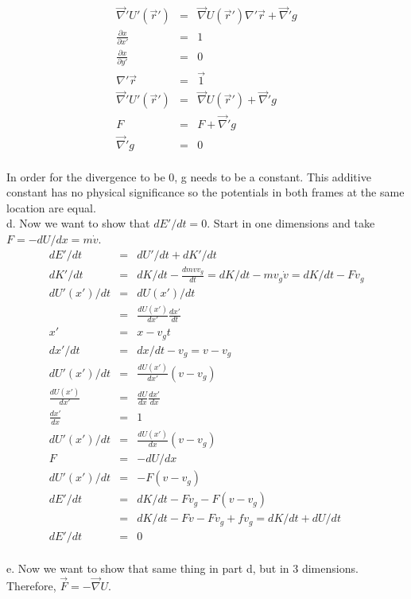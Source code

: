 \documentclass[11pt]{amsart}
\begin{document}
\begin{eqnarray*}
\vec{\nabla}'U'(\vec{r}') &=&\vec{\nabla}U(\vec{r}')\nabla'{\vec{r}} +\vec{\nabla}'g \\
\frac{\partial{x}}{\partial{x'}} &=& 1 \\
\frac{\partial{x}}{\partial{y'}} &=& 0 \\
\nabla'{\vec{r}} &=& \vec{1} \\
\vec{\nabla}'U'(\vec{r}') &=& \vec{\nabla}U(\vec{r}') + \vec{\nabla}'g \\
F &=& F+ \vec{\nabla}'g \\
 \vec{\nabla}'g &=& 0 
\end{eqnarray*} \\
In order for the divergence to be 0, g needs to be a constant. This additive constant has no physical significance so the potentials in both frames at the same location are equal. \\
d. Now we want to show that $dE'/dt=0$. Start in one dimensions and take $F=-dU/dx=m\dot{v}$. \\
\begin{eqnarray*}
dE'/dt &=& dU'/dt+dK'/dt \\
dK'/dt &=& dK/dt-\frac{dmvv_{g}}{dt} = dK/dt-mv_{g}\dot{v} = dK/dt -Fv_{g} \\
dU'(x')/dt &=& dU(x')/dt \\
&=& \frac{dU(x')}{dx'}\frac{dx'}{dt} \\
x' &=& x-v_{g}t \\
dx'/dt &=& dx/dt-v_{g} =v-v_{g} \\
dU'(x')/dt &=& \frac{dU(x')}{dx'}(v-v_{g}) \\
\frac{dU(x')}{dx'} &=& \frac{dU}{dx}\frac{dx'}{dx} \\
\frac{dx'}{dx} &=& 1 \\
dU'(x')/dt &=& \frac{dU(x')}{dx}(v-v_{g}) \\
F &=& -dU/dx \\
dU'(x')/dt &=& -F(v-v_{g}) \\
dE'/dt &=& dK/dt -Fv_{g} -F(v-v_{g}) \\
&=& dK/dt-Fv-Fv_{g}+fv_{g} = dK/dt+dU/dt \\
dE'/dt &=& 0 
\end{eqnarray*} \\
e. Now we want to show that same thing in part d, but in 3 dimensions. Therefore, $\vec{F}=-\vec{\nabla}U$. \\
\end{document}
